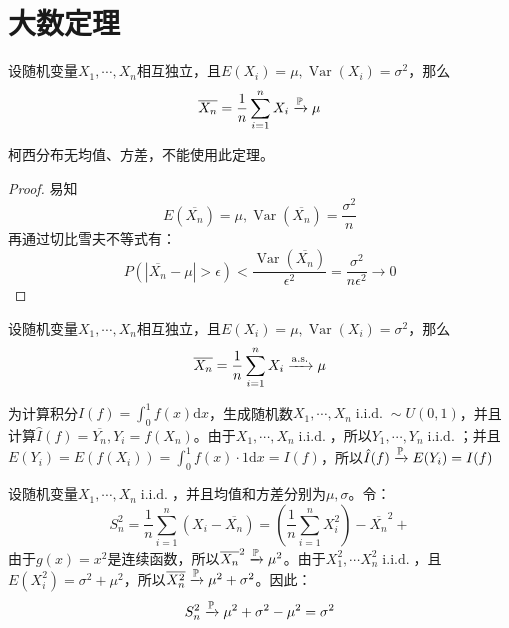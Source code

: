 \section{大数定理}

\begin{theorem}[弱大数定理]
    设随机变量$X_1,\cdots ,X_n$相互独立，且$E(X_i)=\mu,\operatorname{Var}(X_i)=\sigma^2$，那么
    \[ \overline{X_n}=\frac{1}{n}\sum_{i=1}^n X_i \xrightarrow{\P} \mu \]
\end{theorem}

\begin{remark}
    柯西分布无均值、方差，不能使用此定理。
\end{remark}

\begin{proof}
    易知
    \[ E(\overline{X_n})=\mu,\operatorname{Var}(\overline{X_n})=\frac{\sigma^2}{n} \]
    再通过切比雪夫不等式有：
    \[ P(\left\vert \overline{X_n}-\mu \right\vert >\epsilon)<\frac{\operatorname{Var}(\overline{X_n})}{\epsilon^{2}}=\frac{\sigma^2}{n \epsilon^2} \to 0 \]
\end{proof}

\begin{theorem}[强大数定理]
    设随机变量$X_1,\cdots ,X_n$相互独立，且$E(X_i)=\mu,\operatorname{Var}(X_i)=\sigma^2$，那么
    \[ \overline{X_n}=\frac{1}{n}\sum_{i=1}^n X_i \xrightarrow{\as} \mu \]
\end{theorem}

\begin{example}[蒙特卡洛积分]
    为计算积分$I(f)=\int_0^1 f(x)\mathrm{d}x$，生成随机数$X_1,\cdots ,X_n \operatorname{i.i.d.} \sim U(0,1)$，并且计算$\hat{I}(f)=\overline{Y_n}, Y_i=f(X_n) $。由于$X_1,\cdots ,X_n \operatorname{i.i.d.}$，所以$Y_1,\cdots ,Y_n \operatorname{i.i.d.}$；并且$E(Y_i)=E(f(X_i))=\int_0^1 f(x)\cdot 1\mathrm{d}x=I(f)$，所以$\hat{I}(f)\xrightarrow{\P} E(Y_i)=I(f)$
\end{example}

\begin{example}[样本方差]\label{ex:sample_var}
    设随机变量$X_1,\cdots ,X_n \operatorname{i.i.d.}$，并且均值和方差分别为$\mu,\sigma$。令：
    \[ S_n^2=\frac{1}{n}\sum_{i=1}^n(X_i-\overline{X_n}) = (\frac{1}{n}\sum_{i=1}^nX_i^2)-\overline{X_n}^2 +\]
    由于$g(x)=x^2$是连续函数，所以$\overline{X_n}^2 \xrightarrow{\P} \mu^2$。由于$X_1^2,\cdots X_n^2 \operatorname{i.i.d.}$，且$E(X_i^2)=\sigma^2+\mu^2$，所以$\overline{X_n^2} \xrightarrow{\P} \mu^2+\sigma^2$。因此：
    \[ S_n^2 \xrightarrow{\P}\mu^2+\sigma^2-\mu^2= \sigma^2 \]
\end{example}

